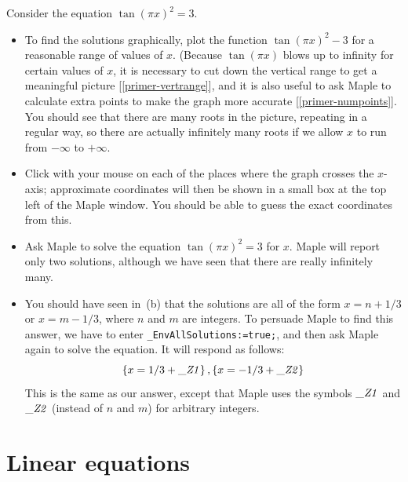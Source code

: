 \documentclass[a4paper,10pt]{amsbook}
\begin{document}
\begin{exercise}
 Consider the equation $\tan(\pi x)^2=3$.  
 \begin{itemize}
  \item[(a)] To find the solutions graphically, plot the
   function $\tan(\pi x)^2-3$ for a reasonable range of
   values of $x$.  (Because $\tan(\pi x)$ blows up to
   infinity for certain values of $x$, it is necessary to cut
   down the vertical range to get a meaningful picture
   [\ref{primer-vertrange}], and it is also useful to ask Maple
   to calculate extra points to make the graph more accurate
   [\ref{primer-numpoints}].  You should see that there are many
   roots in the picture, repeating in a regular way, so there
   are actually infinitely many roots if we allow $x$ to run
   from $-\infty$ to $+\infty$.
  \item[(b)] Click with your mouse on each of the places where the
   graph crosses the $x$-axis; approximate coordinates will then be
   shown in a small box at the top left of the Maple window.  You
   should be able to guess the exact coordinates from this. 
  \item[(c)] Ask Maple to solve the equation $\tan(\pi x)^2=3$ for $x$. 
   Maple will report only two solutions, although we have seen that
   there are really infinitely many. 
  \item[(d)] You should have seen in~(b) that the solutions are all of
   the form $x=n+1/3$ or $x=m-1/3$, where $n$ and $m$ are integers. 
   To persuade Maple to find this answer, we have to enter
   \verb~_EnvAllSolutions:=true;~, and then ask Maple again to solve
   the equation.  It will respond as follows:
   \[ \left\{ x=1/3+{\it \_Z1} \right\} ,
      \left\{ x=-1/3+{\it \_Z2} \right\} 
   \]
   This is the same as our answer, except that Maple uses the symbols 
   $\it \_Z1$ and $\it \_Z2$ (instead of $n$ and $m$) for arbitrary
   integers.  
 \end{itemize}
\end{exercise}

\section{Linear equations}
 
\end{document}
